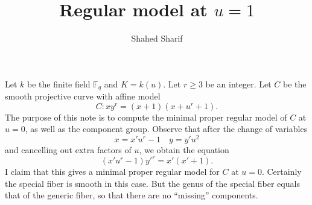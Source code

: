 \documentclass[pagesize,paper=letter]{scrartcl}
\theoremstyle{plain}
\theoremstyle{definition}
\theoremstyle{remark}
\newcommand{\F}{\ensuremath{\mathbb{F}}}
\begin{document}
\title{Regular model at $u=1$}
\author{Shahed Sharif}
\maketitle

Let $k$ be the finite field $\F_q$ and $K = k(u)$. Let $r \geq 3$ be an integer. Let $C$ be the smooth projective curve with affine model
\[
C: xy^r = (x+1)(x+u^r+1).
\]
The purpose of this note is to compute the minimal proper regular model of $C$ at $u = 0$, as well as the component group. Observe that after the change of variables
\[
x = x'u^r - 1 \quad y = y'u^2
\]
and cancelling out extra factors of $u$, we obtain the equation
\[
(x'u^r - 1)y'^r = x'(x'+1).
\]
I claim that this gives a minimal proper regular model for $C$ at $u = 0$. Certainly the special fiber is smooth in this case. But the genus of the special fiber equals that of the generic fiber, so that there are no ``missing'' components.



\end{document}
